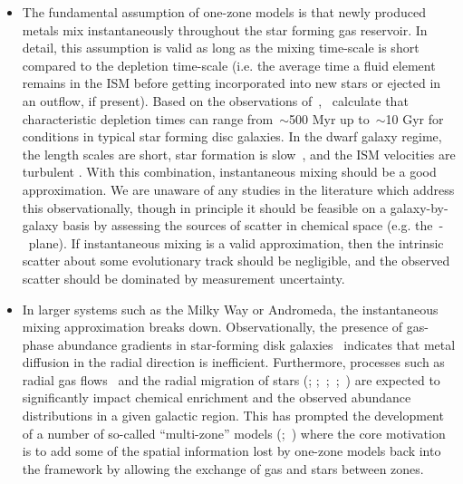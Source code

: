 \documentclass[ms.tex]{subfiles}
\begin{document}
\begin{itemize}	

	\item The fundamental assumption of one-zone models is that newly produced
	metals mix instantaneously throughout the star forming gas reservoir.
	In detail, this assumption is valid as long as the mixing time-scale
	is short compared to the depletion time-scale (i.e. the average time a
	fluid element remains in the ISM before getting incorporated into new
	stars or ejected in an outflow, if present).
	Based on the observations of~\citet{Leroy2008},~\citet*{Weinberg2017}
	calculate that characteristic depletion times can range from~$\sim$500 Myr
	up to~$\sim$10 Gyr for conditions in typical star forming disc galaxies.
	In the dwarf galaxy regime, the length scales are short, star formation
	is slow~\citep{Hudson2015}, and the ISM velocities are turbulent
	\citep{Dutta2009, Stilp2013, Schleicher2016}.
	With this combination, instantaneous mixing should be a good approximation.
	We are unaware of any studies in the literature which address this
	observationally, though in principle it should be feasible on a
	galaxy-by-galaxy basis by assessing the sources of scatter in chemical
	space (e.g. the~\afe-\feh~plane).
	If instantaneous mixing is a valid approximation, then the intrinsic
	scatter about some evolutionary track should be negligible, and the
	observed scatter should be dominated by measurement uncertainty.

	\item In larger systems such as the Milky Way or Andromeda, the
	instantaneous mixing approximation breaks down.
	Observationally, the presence of gas-phase abundance gradients in
	star-forming disk galaxies~\citep*[see, e.g., recent reviews
	by][]{Kewley2019, Maiolino2019, Sanchez2020} indicates that metal diffusion
	in the radial direction is inefficient.
	Furthermore, processes such as radial gas flows~\citep{Lacey1985,
	Bilitewski2012, Vincenzo2020, Sharda2021} and the radial migration of stars
	(\citealp{Sellwood2002, Roskar2008a, Roskar2008b, Loebman2011, Minchev2011};
	\citealp*{Bird2012};~\citealp{Bird2013};~\citealp*{Grand2012a, Grand2012b,
	Kubryk2013};~\citealp{Okalidis2022}) are expected to significantly
	impact chemical enrichment and the observed abundance distributions in a
	given galactic region.
	This has prompted the development of a number of so-called ``multi-zone''
	models (\citealp*{Minchev2013, Minchev2014};~\citealp{Minchev2017,
	Johnson2021, Chen2022}) where the core motivation is to add some of the
	spatial information lost by one-zone models back into the framework by
	allowing the exchange of gas and stars between zones.


\end{itemize}
\end{document}
